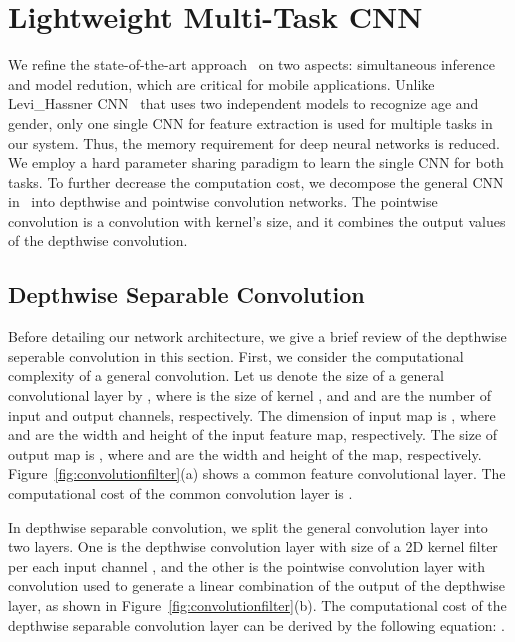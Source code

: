 \documentclass[times, 10pt,twocolumn]{article}
\begin{document}
\section{Lightweight Multi-Task CNN} \label{sec:methodology}

We refine the state-of-the-art approach~\cite{levi2015age} on two aspects: simultaneous inference and model redution, which are critical for mobile applications.
Unlike Levi\_Hassner CNN~\cite{levi2015age} that uses two independent models to recognize age and gender, only one single CNN for feature extraction is used for multiple tasks in our system.
Thus, the memory requirement for deep neural networks is reduced.
We employ a hard parameter sharing paradigm to learn the single CNN for both tasks. 
To further decrease the computation cost, we decompose the general CNN in~\cite{levi2015age} into depthwise and pointwise convolution networks.
The pointwise convolution is a convolution with  kernel's size, and it combines the output values of the depthwise convolution.


\subsection{Depthwise Separable Convolution} \label{subsec:depthwiseseparableconvolution}

Before detailing our network architecture, we give a brief review of the depthwise seperable convolution in this section. First, we consider the computational complexity of a general convolution.
Let us denote the size of a general convolutional layer by , where  is the size of kernel , and  and  are the number of input and output channels, respectively. 
The dimension of input map is , where  and  are the width and height of the input feature map, respectively. 
The size of output map  is , where  and  are the width and height of the map, respectively. 
Figure~\ref{fig:convolutionfilter}(a) shows a common feature convolutional layer. 
The computational cost of the common convolution layer is .





In depthwise separable convolution, we split the general convolution layer into two layers. 
One is the depthwise convolution layer with size  of a 2D kernel filter per each input channel ,  and the other is the pointwise convolution layer with   convolution used to generate a linear combination of the output of the depthwise layer, as shown in Figure~\ref{fig:convolutionfilter}(b). 
The computational cost of the depthwise separable convolution layer can be derived by the following equation: .
\end{document}
